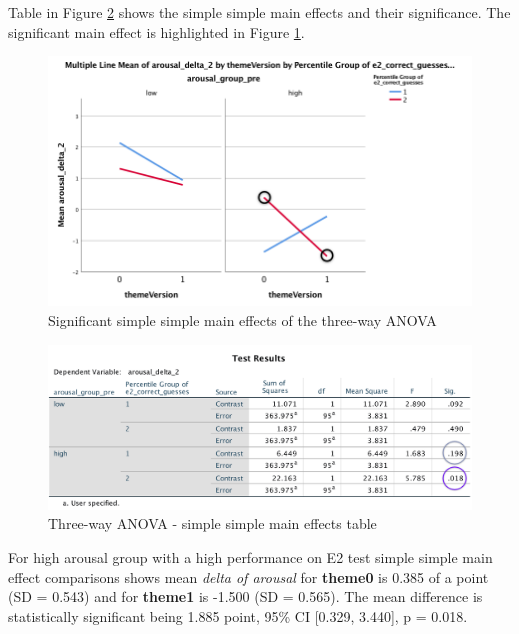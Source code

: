 	Table in Figure \ref{fig:h02-simple-simple-main-effects-test-results-table} shows the simple simple main effects and their significance. The significant main effect is highlighted in Figure \ref{fig:h02-simple-simple-main-effects-highlighted}.
	
	
\begin{figure}
	\centering
	\includegraphics[width=1\linewidth]{graphics/H02-simple-simple-main-effects-highlighted}
	\caption{Significant simple simple main effects of the three-way ANOVA}
	\label{fig:h02-simple-simple-main-effects-highlighted}
\end{figure}
	
\begin{figure}
	\centering
	\includegraphics[width=1\linewidth]{graphics/H02-simple-simple-main-effects-test-results-table}
	\caption{Three-way ANOVA - simple simple main effects table}
	\label{fig:h02-simple-simple-main-effects-test-results-table}
\end{figure}

	For high arousal group with a high performance on E2 test simple simple main effect comparisons shows mean \textit{delta of arousal} for \textbf{theme0} is 0.385 of a point (SD = 0.543) and for \textbf{theme1} is -1.500 (SD = 0.565). The mean difference is statistically significant being 1.885 point, 95\% CI [0.329, 3.440], p = 0.018.
	
